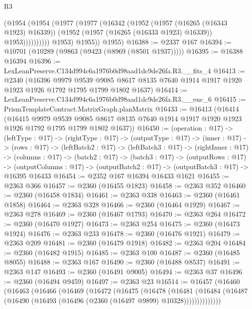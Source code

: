 \begin{lexlean}{R3}
\begin{coremodule}
                  (@1954
                    (@1954
                      (@1977
                        (@1977
                          (@16342
                            (@1952
                              (@1957 (@16265 (@16343 @1923) @16339))
                              (@1952 (@1957 (@16265 (@16333 @1923) @16339)) @1953))))))))))
            @1953)
          @1955))
      @1955)
@16388 := @2337 @167
@16394 := @10701 (@10289 (@9863 (@9423 (@8969 (@8501 @1937)))))
@16395 := @16388 @16394
@16396 := LexLeanPreserve.C134d994c6a1976b0d98aad1dc9de26fa.R3.__fits_4
@16413 := @2340
    (@16396
      @9979
      @9539
      @9085
      @8617
      @8135
      @7640
      @1914
      @1917
      @1920
      @1923
      @1926
      @1792
      @1795
      @1799
      @1802
      @1637)
@16414 := LexLeanPreserve.C134d994c6a1976b0d98aad1dc9de26fa.R3.__enc_6
@16415 := PrismTemplateContract.MatrixGraph.planMatrix
@16433 := @16413
    (@16414
      (@16415
        @9979
        @9539
        @9085
        @8617
        @8135
        @7640
        @1914
        @1917
        @1920
        @1923
        @1926
        @1792
        @1795
        @1799
        @1802
        @1637))
@16450 := (operation : @17) ->
  (leftType : @17) ->
  (rightType : @17) ->
  (outputType : @17) ->
  (inner : @17) ->
  (rows : @17) ->
  (leftBatch2 : @17) ->
  (leftBatch3 : @17) ->
  (rightInner : @17) ->
  (columns : @17) ->
  (batch2 : @17) ->
  (batch3 : @17) ->
  (outputRows : @17) ->
  (outputColumns : @17) -> (outputBatch2 : @17) -> (outputBatch3 : @17) -> @16395 @16433
@16454 := @2352 @167 @16394 @16433 @1621
@16455 := @2363 @366
@16457 := @2360 (@16455 @1823)
@16458 := @2363 @352
@16460 := @2360 (@16458 @1834)
@16461 := @2363 @338
@16463 := @2360 (@16461 @1858)
@16464 := @2363 @328
@16466 := @2360 (@16464 @1929)
@16467 := @2363 @278
@16469 := @2360 (@16467 @1793)
@16470 := @2363 @264
@16472 := @2360 (@16470 @1927)
@16473 := @2363 @254
@16475 := @2360 (@16473 @1924)
@16476 := @2363 @233
@16478 := @2360 (@16476 @1921)
@16479 := @2363 @209
@16481 := @2360 (@16479 @1918)
@16482 := @2363 @204
@16484 := @2360 (@16482 @1915)
@16485 := @2363 @100
@16487 := @2360 (@16485 @8055)
@16488 := @2363 @167
@16490 := @2360 (@16488 @8537)
@16491 := @2363 @147
@16493 := @2360 (@16491 @9005)
@16494 := @2363 @37
@16496 := @2360 (@16494 @9459)
@16497 := @2363 @23
@16514 := @16457
    (@16460
      (@16463
        (@16466
          (@16469
            (@16472
              (@16475
                (@16478
                  (@16481
                    (@16484
                      (@16487 (@16490 (@16493 (@16496 (@2360 (@16497 @9899) @10328))))))))))))))

\end{coremodule}
\end{lexlean}
